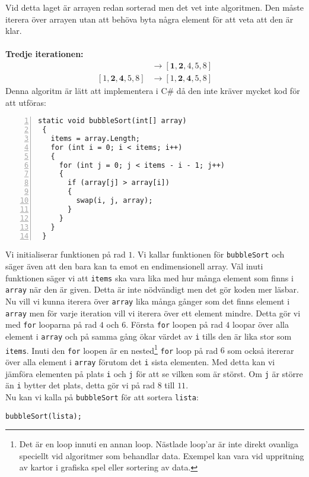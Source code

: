 \documentclass[a4, oneside]{report}
\begin{document}
Vid detta laget är arrayen redan sorterad men det vet inte algoritmen. Den måste iterera över arrayen utan att behöva byta några element för att veta att den är klar.\\\\
\textbf{Tredje iterationen:}
\begin{align*}
    [\textbf{1}, \textbf{2}, 4, 5, 8] &\rightarrow [\textbf{1}, \textbf{2}, 4, 5, 8]\\
    [1, \textbf{2}, \textbf{4}, 5, 8] &\rightarrow [1, \textbf{2}, \textbf{4}, 5, 8]
\end{align*}
Denna algoritm är lätt att implementera i C\# då den inte kräver mycket kod för att utföras:
\begin{lstlisting}[style=mystyle, numbers=left]
 static void bubbleSort(int[] array)
 {
   items = array.Length;
   for (int i = 0; i < items; i++)
   {
     for (int j = 0; j < items - i - 1; j++)
     {
       if (array[j] > array[i])
       {
         swap(i, j, array);
       }
     }
   }
 }
\end{lstlisting}
Vi initialiserar funktionen på rad $1$. Vi kallar funktionen för \lstinline{bubbleSort} och säger även att den bara kan ta emot en endimensionell array. Väl inuti funktionen säger vi att \lstinline{items} ska vara lika med hur många element som finns i \lstinline{array} när den är given. Detta är inte nödvändigt men det gör koden mer läsbar. Nu vill vi kunna iterera över \lstinline{array} lika många gånger som det finns element i \lstinline{array} men för varje iteration vill vi iterera över ett element mindre. Detta gör vi med \lstinline{for} looparna på rad $4$ och $6$. Första \lstinline{for} loopen på rad $4$ loopar över alla element i \lstinline{array} och på samma gång ökar värdet av \lstinline{i} tills den är lika stor som \lstinline{items}. Inuti den \lstinline{for} loopen är en nested\footnote{Det är en loop innuti en annan loop. Nästlade loop'ar är inte direkt ovanliga speciellt vid algoritmer som behandlar data. Exempel kan vara vid uppritning av kartor i grafiska spel eller sortering av data.} \lstinline{for} loop på rad $6$ som också itererar över alla element i \lstinline{array} förutom det \lstinline{i} sista elementen. Med detta kan vi jämföra elementen på plats \lstinline{i} och \lstinline{j} för att se vilken som är störst. Om \lstinline{j} är större än \lstinline{i} bytter det plats, detta gör vi på rad $8$ till $11$.\\
Nu kan vi kalla på \lstinline{bubbleSort} för att sortera \lstinline{lista}:
\begin{lstlisting}[style=mystyle, numbers=none]
 bubbleSort(lista);
\end{lstlisting}
\end{document}
